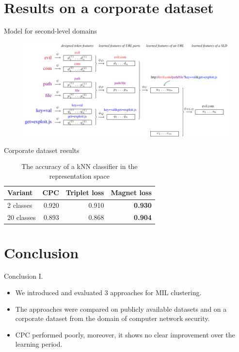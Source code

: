 \documentclass[10pt]{beamer}
\begin{document}
\section{Results on a corporate dataset}

\begin{frame}{Model for second-level domains}
  \begin{figure}
  \centering
	\includegraphics[width=\textwidth]{images/URL-model/URL-model.pdf}
  \end{figure}
\end{frame}

\begin{frame}{Corporate dataset results}
  \begin{table}
  \centering
  \begin{tabular}{lrrr}
    \toprule
    Variant    & CPC   & Triplet loss & Magnet loss \\
    \midrule
    2 classes  & 0.920 & 0.910        & \textbf{0.930} \\
    20 classes & 0.893 & 0.868        & \textbf{0.904} \\
    \bottomrule
  \end{tabular}
  \caption{The accuracy of a kNN classifier in the representation space}
\end{table}
\end{frame}

\section{Conclusion}

\begin{frame}{Conclusion I.}
	\begin{itemize}
		\item We introduced and evaluated 3 approaches for MIL clustering.
		\item The approaches were compared on publicly available datasets and on a corporate dataset from the domain of computer network security.
		\item CPC performed poorly, moreover, it shows no clear improvement over the learning period.
	\end{itemize}
\end{frame}
\end{document}
